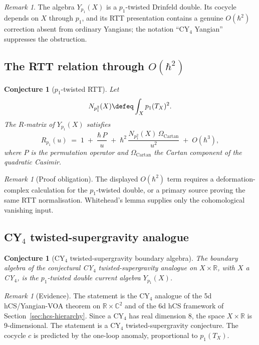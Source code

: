 \documentclass[11pt]{article}
\theoremstyle{plain}
\newtheorem{conjecture}[theorem]{Conjecture}
\theoremstyle{definition}
\theoremstyle{remark}
\newtheorem{remark}[theorem]{Remark}
\newcommand{\bC}{\mathbb{C}}
\newcommand{\bR}{\mathbb{R}}
\begin{document}
\begin{remark}
The algebra $Y_{p_1}(X)$ is a $p_1$-twisted Drinfeld double.  Its
cocycle depends on $X$ through $p_1$, and its RTT presentation contains
a genuine $O(\hbar^2)$ correction absent from ordinary Yangians; the
notation ``CY$_4$ Yangian'' suppresses the obstruction.
\end{remark}

\subsection{The RTT relation through $O(\hbar^2)$}

\begin{conjecture}[$p_1$-twisted RTT]
\label{conj:cy4-rtt-p1}
Let
\[
N_{p_1^2}(X)\defeq \int_X p_1(T_X)^2 .
\]
The $R$-matrix of $Y_{p_1}(X)$ satisfies
\[
R_{p_1}(u) \;=\; 1 \;+\; \frac{\hbar\,P}{u}
\;+\; \hbar^2\,\frac{N_{p_1^2}(X)\,\Omega_{\mathrm{Cartan}}}{u^2}
\;+\; O(\hbar^3),
\]
where $P$ is the permutation operator and $\Omega_{\mathrm{Cartan}}$
the Cartan component of the quadratic Casimir.
\end{conjecture}

\begin{remark}[Proof obligation]
\label{rem:cy4-rtt-p1-proof-obligation}
The displayed $O(\hbar^2)$ term requires a deformation-complex
calculation for the $p_1$-twisted double, or a primary source proving
the same RTT normalisation.  Whitehead's lemma supplies only the
cohomological vanishing input.
\end{remark}

\subsection{CY$_4$ twisted-supergravity analogue}

\begin{conjecture}[CY$_4$ twisted-supergravity boundary algebra]
\label{conj:cy4-twisted-supergravity-boundary-algebra}
The boundary algebra of the conjectural CY$_4$ twisted-supergravity
analogue on $X \times \bR$, with $X$ a CY$_4$, is the $p_1$-twisted
double current algebra $Y_{p_1}(X)$.
\end{conjecture}

\begin{remark}[Evidence]
The statement is the CY$_4$ analogue of the 5d hCS/Yangian-VOA
theorem on $\bR\times\bC^2$ and of the 6d hCS framework of
Section~\ref{sec:hcs-hierarchy}. Since a CY$_4$ has real dimension
8, the space $X\times\bR$ is 9-dimensional. The statement is a
CY$_4$ twisted-supergravity conjecture. The cocycle $c$ is
predicted by the one-loop anomaly, proportional to $p_1(T_X)$.
\end{remark}
\end{document}
